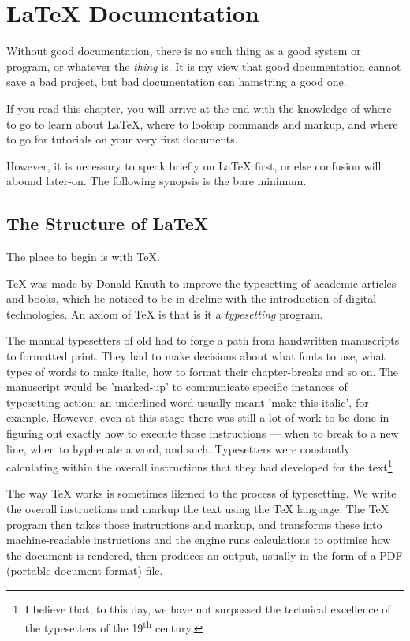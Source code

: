 \documentclass[11pt, oneside]{memoir}
\begin{document}
\chapter{\LaTeX{} Documentation}
Without good documentation, there is no such thing as a good system or program, or whatever the \emph{thing} is. It is my view that good documentation cannot save a bad project, but bad documentation can hamstring a good one.

If you read this chapter, you will arrive at the end with the knowledge of where to go to learn about LaTeX, where to lookup commands and markup, and where to go for tutorials on your very first documents.

However, it is necessary to speak briefly on LaTeX first, or else confusion will abound later-on. The following synopsis is the bare minimum.

\section{The Structure of \LaTeX{}}

The place to begin is with \TeX{}.

TeX was made by Donald Knuth to improve the typesetting of academic articles and books, which he noticed to be in decline with the introduction of digital technologies. An axiom of \TeX{} is that is it a \emph{typesetting} program. 

The manual typesetters of old had to forge a path from handwritten manuscripts to formatted print. They had to make decisions about what fonts to use, what types of words to make italic, how to format their chapter-breaks and so on. The manuscript would be 'marked-up' to communicate specific instances of typesetting action; an underlined word usually meant 'make this italic', for example. However, even at this stage there was still a lot of work to be done in figuring out exactly how to execute those instructions — when to break to a new line, when to hyphenate a word, and such. Typesetters were constantly calculating within the overall instructions that they had developed for the text\footnote{I believe that, to this day, we have not surpassed the technical excellence of the typesetters of the 19\textsuperscript{th} century.}

The way TeX works is sometimes likened to the process of typesetting. We write the overall instructions and markup the text using the TeX language. The TeX program then takes those instructions and markup, and transforms these into machine-readable instructions and the engine runs calculations to optimise how the document is rendered, then produces an output, usually in the form of a PDF (portable document format) file.
\end{document}
